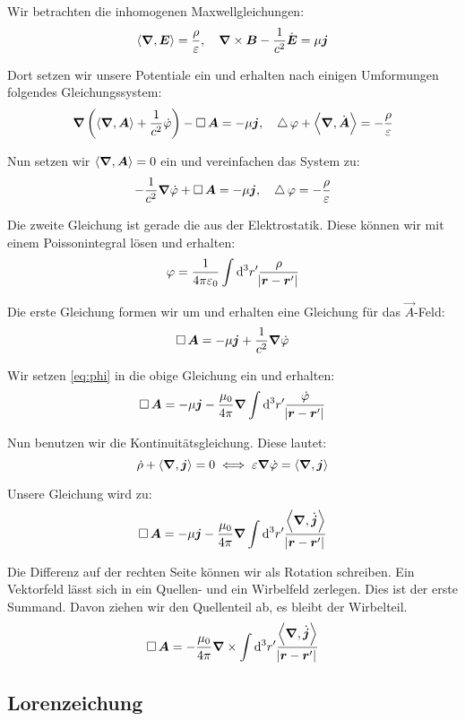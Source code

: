 Wir betrachten die inhomogenen Maxwellgleichungen:
\[
	\left\langle \boldsymbol{\nabla}, \boldsymbol{E} \right\rangle = \frac{\rho}{\varepsilon}
	,\quad
	\boldsymbol{\nabla} \times \boldsymbol{B} - \frac{1}{c^2} \dot{\boldsymbol{E}} = \mu \boldsymbol{j}
\]

Dort setzen wir unsere Potentiale ein und erhalten nach einigen Umformungen folgendes Gleichungssystem:
\[
	\vnabla \del{\divergence{\vec A} + \frac{1}{c^2} \dot \varphi} - \dalambert \vec A = - \mu \vec j
	,\quad
	\laplace \varphi + \divergence{\dot{\vec A}} = - \frac{\rho}{\varepsilon}
\]

Nun setzen wir $\left\langle \boldsymbol{\nabla}, \boldsymbol{A} \right\rangle = 0$ ein und vereinfachen das System zu:
\[
	- \frac{1}{c^2} \boldsymbol{\nabla} \dot \varphi + \mathop{{}\Box}\nolimits \boldsymbol{A} = - \mu \boldsymbol{j}
	,\quad
	\mathop{{}\bigtriangleup}\nolimits \varphi = - \frac{\rho}{\varepsilon}
\]

Die zweite Gleichung ist gerade die aus der Elektrostatik. Diese können wir mit einem Poissonintegral lösen und erhalten:
\begin{equation}
	\label{eq:phi}
	\varphi = \frac{1}{4\pi\varepsilon_0} \int \dif{^3 r'} \frac{\rho}{\abs{\vec r - \vec r'}}
\end{equation}

Die erste Gleichung formen wir um und erhalten eine Gleichung für das $\vec A$-Feld:
\[
	\mathop{{}\Box}\nolimits \boldsymbol{A} = - \mu \boldsymbol{j} + \frac{1}{c^2} \boldsymbol{\nabla} \dot \varphi 
\]

Wir setzen \eqref{eq:phi} in die obige Gleichung ein und erhalten:
\[
	\dalambert \vec A = - \mu \vec j - \frac{\mu_0}{4 \pi} \vnabla \int \dif{^3 r'} \frac{\dot \varphi}{\abs{\vec r - \vec r'}}
\]

Nun benutzen wir die Kontinuitätsgleichung. Diese lautet:
\[
	\dot \rho + \left\langle \boldsymbol{\nabla}, \boldsymbol{j} \right\rangle = 0
	\iff
	\varepsilon \boldsymbol{\nabla} \dot \varphi = \left\langle \boldsymbol{\nabla}, \boldsymbol{j} \right\rangle
\]

Unsere Gleichung wird zu:
\[
	\dalambert \vec A = - \mu \vec j - \frac{\mu_0}{4 \pi} \vnabla \int \dif{^3 r'} \frac{\divergence{\dot{\vec j}}}{\abs{\vec r - \vec r'}}
\]

Die Differenz auf der rechten Seite können wir als Rotation schreiben. Ein Vektorfeld lässt sich in ein Quellen- und ein Wirbelfeld zerlegen. Dies ist der erste Summand. Davon ziehen wir den Quellenteil ab, es bleibt der Wirbelteil.
\[
	\dalambert \vec A = - \frac{\mu_0}{4 \pi} \curl \int \dif{^3 r'} \frac{\divergence{\dot{\vec j}}}{\abs{\vec r - \vec r'}}
\]

\subsection{Lorenzeichung}

\fehlt

%
%



